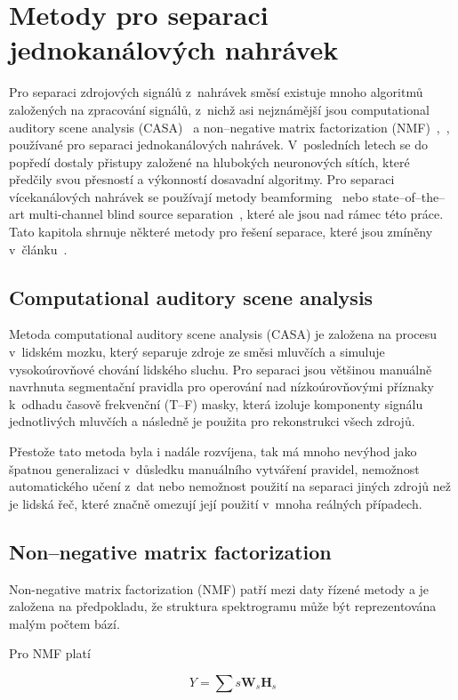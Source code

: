 \section{Metody pro separaci jednokanálových nahrávek}
Pro separaci zdrojových signálů z~nahrávek směsí existuje mnoho algoritmů založených na zpracování signálů, z~nichž asi nejznámější jsou computational auditory scene analysis (CASA)~\cite{choi2005blind} a non--negative matrix factorization (NMF)~\cite{NIPS2000_1861},~\cite{yoshii2013beyond}, používané pro separaci jednokanálových nahrávek. V~posledních letech se do popředí dostaly přistupy založené na hlubokých neuronových sítích, které předčily svou přesností a výkonností dosavadní algoritmy. Pro separaci vícekanálových nahrávek se používají metody beamforming~\cite{adel2012beamforming} nebo state--of--the--art multi-channel blind source separation~\cite{Negro_2016}, které ale jsou nad rámec této práce. Tato kapitola shrnuje některé metody pro řešení separace, které jsou zmíněny v~článku~\cite{speechseparation}.


\subsection{Computational auditory scene analysis}
Metoda computational auditory scene analysis (CASA) je založena na procesu v~lidském mozku, který separuje zdroje ze směsi mluvčích a simuluje vysokoúrovňové chování lidského sluchu. Pro separaci jsou většinou manuálně navrhnuta segmentační pravidla pro operování nad nízkoúrovňovými příznaky k~odhadu časově frekvenční (T--F) masky, která izoluje komponenty signálu jednotlivých mluvčích a následně je použita pro rekonstrukci všech zdrojů.

Přestože tato metoda byla i nadále rozvíjena, tak má mnoho nevýhod jako špatnou generalizaci v~důsledku manuálního vytváření pravidel, nemožnost automatického učení z~dat nebo nemožnost použití na separaci jiných zdrojů než je lidská řeč, které značně omezují její použití v~mnoha reálných případech.


\subsection{Non--negative matrix factorization}
Non-negative matrix factorization (NMF) patří mezi daty řízené metody a je založena na předpokladu, že struktura spektrogramu může být reprezentována malým počtem bází.

Pro NMF platí

\begin{equation}
  Y = \sum{s}\textbf{W}_s\textbf{H}_s
\end{equation}

